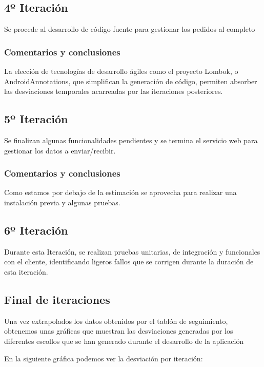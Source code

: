 \subsection{4º Iteración}
Se procede al desarrollo de código fuente para gestionar los pedidos al completo
\subsubsection{Comentarios y conclusiones }
La elección de tecnologías de desarrollo ágiles como el proyecto Lombok, o AndroidAnnotations, que simplifican la generación de código, permiten absorber las desviaciones temporales acarreadas por las iteraciones posteriores.
\subsection{5º Iteración}
Se finalizan algunas funcionalidades pendientes y se termina el servicio web para gestionar los datos a enviar/recibir.
\subsubsection{Comentarios y conclusiones }
Como estamos por debajo de la estimación se aprovecha para realizar una instalación previa y algunas pruebas.   
\subsection{6º Iteración}
Durante esta Iteración, se realizan pruebas unitarias, de integración y funcionales con el cliente, identificando ligeros fallos que se corrigen durante la duración de esta iteración.  

\subsection{Final de iteraciones}
Una vez extrapolados los datos obtenidos por el tablón de seguimiento, obtenemos unas gráficas que muestran las desviaciones generadas por los diferentes escollos que se han generado durante el desarrollo de la aplicación 

En la siguiente gráfica podemos ver la desviación por iteración:\\
	
\begin{figure}[H]
	\centering
	\label{tikz-1}
\end{figure}

